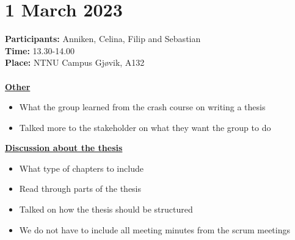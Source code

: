 \section{1 March 2023}
\textbf{Participants:} Anniken, Celina, Filip and Sebastian \\
\textbf{Time:} 13.30-14.00 \\
\textbf{Place:} NTNU Campus Gjøvik, A132
\\~\\
\textbf{\underline{Other}}
\begin{itemize}
    \item What the group learned from the crash course on writing a thesis
    \item Talked more to the stakeholder on what they want the group to do
\end{itemize}

\textbf{\underline{Discussion about the thesis}}
\begin{itemize}
    \item What type of chapters to include
    \item Read through parts of the thesis
    \item Talked on how the thesis should be structured
    \item We do not have to include all meeting minutes from the scrum meetings
\end{itemize}